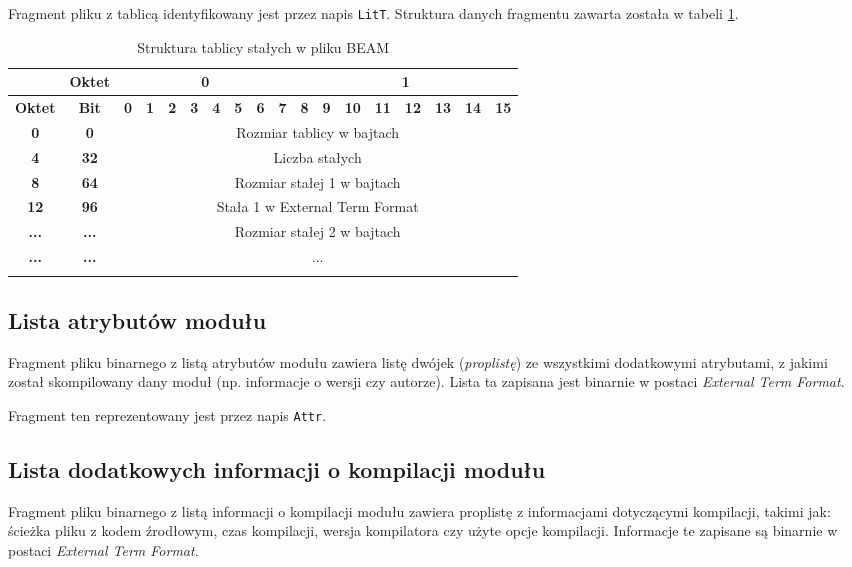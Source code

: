 Fragment pliku z tablicą identyfikowany jest przez napis \texttt{LitT}. Struktura danych fragmentu zawarta została w tabeli \ref{table:literaltable}.

\begin{longtable}{|c|c|c|c|c|c|c|c|c|c|c|c|c|c|c|c|c|c|}
\hline
         & \textbf{Oktet} & \multicolumn{8}{|c|}{\textbf{0}} & \multicolumn{8}{|c|}{\textbf{1}} \\
\hline
\textbf{Oktet} & \textbf{Bit} & \textbf{0} & \textbf{1} & \textbf{2} & \textbf{3} & \textbf{4} & \textbf{5} & \textbf{6} & \textbf{7} & \textbf{8} & \textbf{9} & \textbf{10} & \textbf{11} & \textbf{12} & \textbf{13} & \textbf{14} & \textbf{15}\\
\hline
\textbf{0} & \textbf{0} & \multicolumn{16}{|c|}{Rozmiar tablicy w bajtach} \\[3ex]
\hline
\textbf{4} & \textbf{32} & \multicolumn{16}{|c|}{Liczba stałych}\\[3ex]
\hline
\textbf{8} & \textbf{64} & \multicolumn{16}{|c|}{Rozmiar stałej 1 w bajtach} \\[3ex]
\hline
\textbf{12} & \textbf{96} & \multicolumn{16}{|c|}{Stała 1 w External Term Format}\\[8ex]
\hline
\textbf{...} & \textbf{...} & \multicolumn{16}{|c|}{Rozmiar stałej 2 w bajtach}\\[3ex]
\hline
\textbf{...} & \textbf{...} & \multicolumn{16}{|c|}{...}\\[8ex]
\hline
\caption{Struktura tablicy stałych w pliku BEAM}
\label{table:literaltable} \\
\end{longtable}

\subsection{Lista atrybutów modułu}
Fragment pliku binarnego z listą atrybutów modułu zawiera listę dwójek (\emph{proplistę}) ze wszystkimi dodatkowymi atrybutami, z jakimi został skompilowany dany moduł (np. informacje o wersji czy autorze). Lista ta zapisana jest binarnie w postaci \emph{External Term Format}.

Fragment ten reprezentowany jest przez napis \texttt{Attr}.

\subsection{Lista dodatkowych informacji o kompilacji modułu}
Fragment pliku binarnego z listą informacji o kompilacji modułu zawiera proplistę z informacjami dotyczącymi kompilacji, takimi jak: ścieżka pliku z kodem źrodłowym, czas kompilacji, wersja kompilatora czy użyte opcje kompilacji. Informacje te zapisane są binarnie w postaci \emph{External Term Format}.

